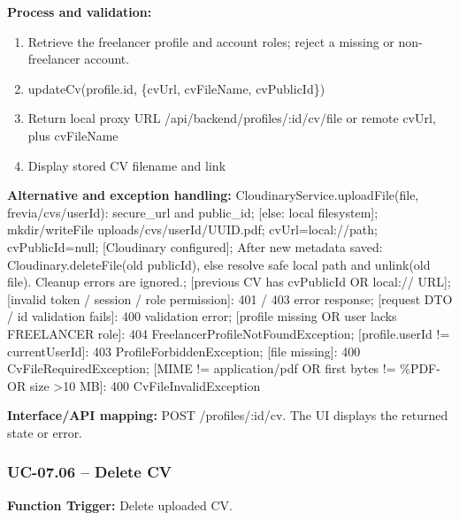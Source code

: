 \textbf{Process and validation:}
\begin{enumerate}
\item Retrieve the freelancer profile and account roles; reject a missing or non-freelancer account.
\item update\allowbreak{}Cv(profile.id, \{cv\allowbreak{}Url, cv\allowbreak{}File\allowbreak{}Name, cv\allowbreak{}Public\allowbreak{}Id\})
\item Return local proxy URL /\allowbreak{}api/\allowbreak{}backend/\allowbreak{}profiles/\allowbreak{}:id/\allowbreak{}cv/\allowbreak{}file or remote cv\allowbreak{}Url, plus cv\allowbreak{}File\allowbreak{}Name
\item Display stored CV filename and link
\end{enumerate}
\textbf{Alternative and exception handling:} Cloudinary\allowbreak{}Service.upload\allowbreak{}File(file, frevia/\allowbreak{}cvs/\allowbreak{}user\allowbreak{}Id): secure\_url and public\_id; [else: local filesystem]; mkdir/\allowbreak{}write\allowbreak{}File uploads/\allowbreak{}cvs/\allowbreak{}user\allowbreak{}Id/\allowbreak{}UUID.pdf; cv\allowbreak{}Url=\allowbreak{}local:/\allowbreak{}/\allowbreak{}path; cv\allowbreak{}Public\allowbreak{}Id=\allowbreak{}null; [Cloudinary configured]; After new metadata saved: Cloudinary.delete\allowbreak{}File(old public\allowbreak{}Id), else resolve safe local path and unlink(old file). Cleanup errors are ignored.; [previous CV has cv\allowbreak{}Public\allowbreak{}Id OR local:/\allowbreak{}/\allowbreak{} URL]; [invalid token /\allowbreak{} session /\allowbreak{} role permission]: 401 /\allowbreak{} 403 error response; [request DTO /\allowbreak{} id validation fails]: 400 validation error; [profile missing OR user lacks FREELANCER role]: 404 Freelancer\allowbreak{}Profile\allowbreak{}Not\allowbreak{}Found\allowbreak{}Exception; [profile.user\allowbreak{}Id !=\allowbreak{} current\allowbreak{}User\allowbreak{}Id]: 403 Profile\allowbreak{}Forbidden\allowbreak{}Exception; [file missing]: 400 Cv\allowbreak{}File\allowbreak{}Required\allowbreak{}Exception; [MIME !=\allowbreak{} application/\allowbreak{}pdf OR first bytes !=\allowbreak{} \%PDF- OR size >10 MB]: 400 Cv\allowbreak{}File\allowbreak{}Invalid\allowbreak{}Exception

\textbf{Interface/\allowbreak{}API mapping:} POST /\allowbreak{}profiles/\allowbreak{}:id/\allowbreak{}cv. The UI displays the returned state or error.

\subsubsection{UC-07.06 -- Delete CV}
\textbf{Function Trigger:} Delete uploaded CV.

